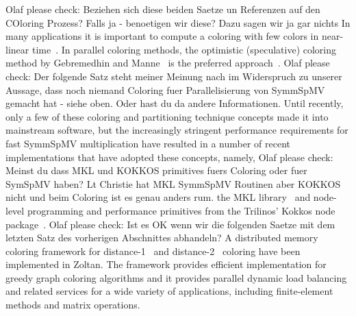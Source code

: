 {\GW Olaf please check: Beziehen sich diese beiden Saetze un Referenzen auf den COloring Prozess? Falls ja - benoetigen wir diese? Dazu sagen wir ja gar nichts}
In many applications it is important to compute a coloring with few
colors in near-linear time~\cite{doi:10.1137/13093426X}.
In parallel coloring methods, the optimistic (speculative) coloring method by Gebremedhin
and Manne~\cite{gebremedhin2000scalable} is the preferred
approach~\cite{Boman:2016}.  
{\GW Olaf please check: Der folgende Satz steht meiner Meinung nach im Widerspruch zu unserer Aussage, dass noch niemand Coloring fuer Parallelisierung von SymmSpMV gemacht hat - siehe oben. Oder hast du da andere Informationen.}
Until recently, only a few of these
coloring and partitioning technique concepts made it into mainstream
software, but the increasingly stringent performance requirements for
fast \acrshort{SymmSpMV} multiplication have resulted in a number of recent
implementations that have adopted these concepts, namely,
{\GW Olaf please check: Meinst du dass MKL und KOKKOS primitives fuers Coloring oder fuer SymSpMV haben? Lt Christie hat MKL SymmSpMV Routinen aber KOKKOS nicht und beim Coloring ist es genau anders rum.}
the \acrshort{MKL} library~\cite{MKL} and node-level programming and
performance primitives from the Trilinos' Kokkos node
package~\cite{kokkos}. 
{\GW Olaf please check: Ist es OK wenn wir die folgenden Saetze mit dem letzten Satz des vorherigen Abschnittes abhandeln?}
A distributed memory coloring framework for
distance-1~\cite{BOZDAG2008515} and
distance-2~\cite{doi:10.1137/080732158} coloring have been implemented
in Zoltan. The framework provides efficient implementation for greedy
graph coloring algorithms and it provides parallel dynamic load
balancing and related services for a wide variety of applications,
including finite-element methods and matrix operations.  
%
	
